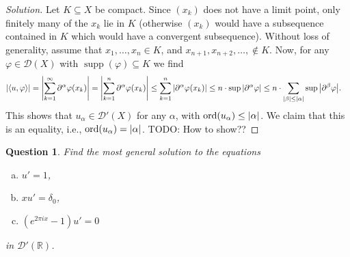 \documentclass{article}
\theoremstyle{plain}
\newtheorem{question}{Question}
\theoremstyle{remark}
\newenvironment{solution}{\begin{proof}[Solution]\renewcommand\qedsymbol{}}{\end{proof}}
\renewcommand{\phi}{\varphi}
\newcommand{\Bb}{\mathbb}
\newcommand{\Cal}{\mathcal}
\newcommand{\RR}{\Bb R}
\newcommand{\DD}{\Cal D}
\DeclarePairedDelimiter{\ang}{\langle}{\rangle}
\newcommand\TODO{{\color{red} TODO: }}
\newcommand\pt\partial
\DeclareMathOperator{\supp}{supp}
\DeclareMathOperator{\ord}{ord}
\begin{document}
\begin{solution}
	Let $K \subseteq X$ be compact. Since $(x_k)$ does not have a limit point, only finitely many of the $x_k$ lie in $K$ (otherwise $(x_k)$ would have a subsequence contained in $K$ which would have a convergent subsequence). Without loss of generality, assume that $x_1, \dotsc, x_n \in K$, and $x_{n+1}, x_{n+2}, \dotsc, \notin K$. Now, for any $\phi \in \DD(X)$ with $\supp(\phi) \subseteq K$ we find
	\begin{align*}
		\abs{\ang{u, \phi}} &= \abs{\sum_{k=1}^\infty \pt^\alpha\phi(x_k)} = \abs{\sum_{k=1}^n \pt^\alpha\phi(x_k)} \leq \sum_{k=1}^n \abs{\pt^\alpha \phi(x_k)} \leq n \cdot \sup \abs{\pt^\alpha\phi} \leq n \cdot \sum_{\abs{\beta} \leq \abs{\alpha}} \sup \abs{\pt^\beta \phi}. 
	\end{align*}
	This shows that $u_\alpha \in \DD'(X)$ for any $\alpha$, with $\ord(u_\alpha) \leq \abs{\alpha}$. We claim that this is an equality, i.e., $\ord(u_\alpha) = \abs{\alpha}$. \TODO How to show??
\end{solution}

\begin{question}
	Find the most general solution to the equations
	\begin{enumerate}[(a)]
		\item $u'  = 1$,
		\item $xu' = \delta_0$,
		\item $(e^{2\pi i x} - 1)u' = 0$
	\end{enumerate}
	in $\DD'(\RR)$. 
\end{question}
\end{document}
